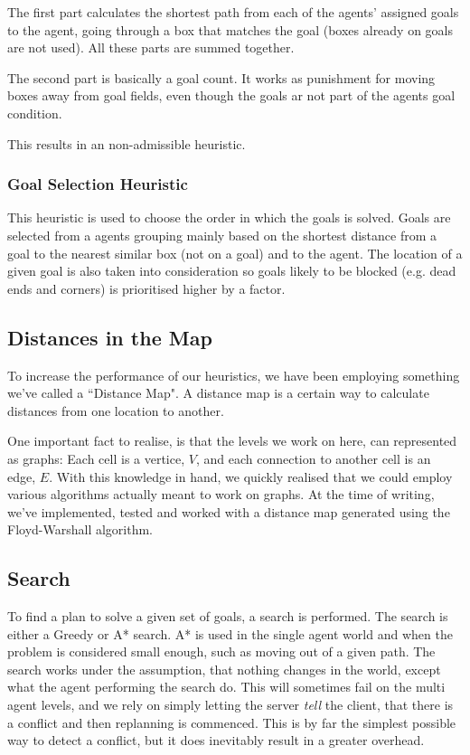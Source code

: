 \documentclass[letterpaper]{article}
\begin{document}
			The first part calculates the shortest path from each of the agents' assigned goals to the agent, going through a box that matches the goal (boxes already on goals are not used). All these parts are summed together.
			
			The second part is basically a goal count. It works as punishment for moving boxes away from goal fields, even though the goals ar not part of the agents goal condition.
			
			This results in an non-admissible heuristic.
		
		\subsubsection{Goal Selection Heuristic}\label{goal2}
			This heuristic is used to choose the order in which the goals is solved. Goals are selected from a agents grouping mainly based on the shortest distance from a goal to the nearest similar box (not on a goal) and to the agent. The location of a given goal is also taken into consideration so goals likely to be blocked (e.g. dead ends and corners) is prioritised higher by a factor.

				
			
	\subsection{Distances in the Map}
		To increase the performance of our heuristics, we have been employing something we've called a ``Distance Map". A distance map is a certain way to calculate distances from one location to another.
			
		One important fact to realise, is that the levels we work on here, can represented as graphs: Each cell is a vertice, $V$, and each connection to another cell is an edge, $E$. With this knowledge in hand, we quickly realised that we could employ various algorithms actually meant to work on graphs. At the time of writing, we've implemented, tested and worked with a distance map generated using the Floyd-Warshall algorithm.

	\subsection{Search}
		\label{sec:search}
		To find a plan to solve a given set of goals, a search is performed. The search is either a Greedy or A* search. A* is used in the single agent world and when the problem is considered small enough, such as moving out of a given path. 
		The search works under the assumption, that nothing changes in the world, except what the agent performing the search do. This will sometimes fail on the multi agent levels, and we rely on simply letting the server \emph{tell} the client, that there is a conflict and then replanning is commenced. This is by far the simplest possible way to detect a conflict, but it does inevitably result in a greater overhead. 
		
\end{document}
